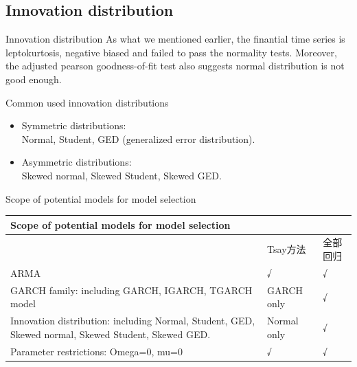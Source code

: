 \documentclass{beamer}
\begin{document}
\subsection{Innovation distribution}
\begin{frame}{Innovation distribution}
  As what we mentioned earlier, the finantial time series is leptokurtosis, negative biased and failed to pass the normality tests. Moreover, the adjusted pearson goodness-of-fit test also suggests normal distribution is not good enough.
  \begin{block}{Common used innovation distributions}
    \begin{itemize}
      \item Symmetric distributions: \\
      Normal, Student, GED (generalized error distribution).
      \item Asymmetric distributions: \\
      Skewed normal, Skewed Student, Skewed GED.
    \end{itemize}
  \end{block}
\end{frame}


\begin{frame}{Scope of potential models for model selection}
\begin{table}[htbp]
  \small
    \begin{tabular}{p{16em}p{5em}p{5em}}
    \toprule
    \multicolumn{3}{C{26em}}{\textbf{Scope of potential models for model selection}} \\
    \midrule
    \multicolumn{1}{r}{} & Tsay方法 & 全部回归 \\
    \midrule
    ARMA & √   & √ \\
    \midrule
    GARCH family: including GARCH, IGARCH, TGARCH model & GARCH only   & √ \\
    \midrule
    Innovation distribution: including Normal, Student, GED, Skewed normal, Skewed Student, Skewed GED. & Normal only & √ \\
    \midrule
    Parameter restrictions: Omega=0, mu=0 & √   & √ \\
    \bottomrule
    \end{tabular}%
  \label{tab:addlabel}%
\end{table}%

\end{frame}
\end{document}
